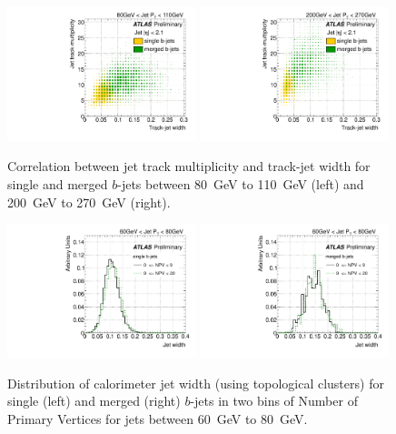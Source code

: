 \begin{figure}[tp]
\centering
\includegraphics[width=0.49\textwidth]{FIGS/VarsSingleMerged/NtrktrkWidth080.pdf}
\includegraphics[width=0.49\textwidth]{FIGS/VarsSingleMerged/NtrktrkWidth200.pdf}
\caption{Correlation between jet track multiplicity and track-jet width for single and merged $b$-jets between 80~GeV to 110~GeV (left) and 200~GeV to 270~GeV (right).}
\label{fig:ntrktrkwidthsinglemerged}
\end{figure}

\begin{figure}[tp]
\centering
\includegraphics[width=0.49\textwidth]{FIGS/systematics/Widthsingle_060.pdf}
\includegraphics[width=0.49\textwidth]{FIGS/systematics/Widthmerged_060.pdf}
\caption{Distribution of calorimeter jet width (using topological clusters) for single (left) and merged (right) $b$-jets in two bins of Number of Primary Vertices for jets between 60~GeV to 80~GeV.}
\label{fig:calowidthpileup}
\end{figure}


